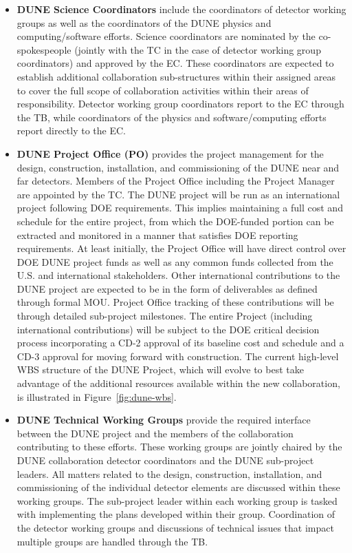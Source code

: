 \begin{itemize}
  \item \textbf{DUNE Science Coordinators} include the coordinators of detector working groups as well as the coordinators of the DUNE physics and computing/software efforts.  Science coordinators are nominated by the co-spokespeople (jointly with the TC in the case of detector working group coordinators) and approved by the EC.  These coordinators are expected to establish additional collaboration sub-structures within their assigned areas to cover the full scope of collaboration activities within their areas of responsibility.  Detector working group coordinators report to the EC through the TB, while coordinators of   the physics and software/computing efforts report directly to the EC.   
  \item \textbf{DUNE Project Office (PO)} provides the project management for the design, construction, installation, and commissioning of the DUNE near and far detectors.  Members of the Project Office including the Project Manager are appointed by the TC.  The DUNE project will be run as an international project following DOE requirements. This implies maintaining a full cost and schedule for the entire project, from which the DOE-funded portion can be extracted and monitored in a manner that satisfies DOE reporting requirements. At least initially, the Project Office will have direct control over DOE DUNE project funds as well as any common funds collected from the U.S. and international stakeholders. Other international contributions to the DUNE project are expected to be in the form of deliverables as defined through formal MOU. Project Office tracking of these  contributions will be through detailed sub-project milestones. The entire Project (including international contributions) will be subject to the DOE critical decision process incorporating a CD-2 approval of its baseline cost and schedule and a CD-3 approval for moving forward with construction.  The current high-level WBS structure of the DUNE Project, which will evolve to best take advantage of the additional resources available within the new collaboration, is illustrated in Figure~\ref{fig:dune-wbs}.
  \item \textbf{DUNE Technical Working Groups} provide the required interface between the DUNE project and the members of the collaboration contributing to these efforts.  These working groups are jointly chaired by the DUNE collaboration detector coordinators and the DUNE sub-project leaders.  All matters related to the design, construction, installation, and commissioning of the individual detector elements are discussed within these working groups.  The sub-project leader within each working group is tasked with implementing the plans developed within their group.  Coordination of the detector working groups and discussions of technical issues that impact multiple groups are handled through the TB. 
\end{itemize}

